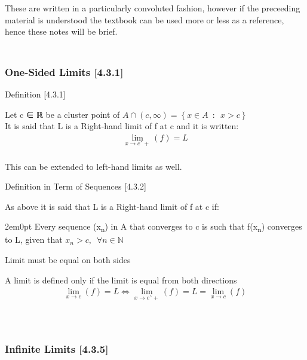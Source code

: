 These are written in a particularly convoluted fashion, however if the
preceeding material is understood the textbook can be used more or less
as a reference, hence these notes will be brief.

\hypertarget{one-sided-limits-4.3.1}{%
\subsubsection[\hfill\break
One-Sided Limits
{[}4.3.1{]}]{\texorpdfstring{\protect\hypertarget{SECTION00013100000000000000}{}{}\protect\hypertarget{one-sided-limits-4.3.1}{}{}~\\
One-Sided Limits
{[}4.3.1{]}}{ One-Sided Limits {[}4.3.1{]}}}\label{one-sided-limits-4.3.1}}

Definition {[}4.3.1{]}\protect\hypertarget{definition-4.3.1}{}{}

Let {c} ∈ ℝ be a cluster point of
\(A\cap \left( c, \infty \right) = \left\{ x \in A \enspace : \enspace x > c \right\}\)\\
It is said that {L} is a {Right-hand limit of {f} at {c}} and it is
written:\\
\[\begin{aligned} \lim_{x
\rightarrow cˆ+} \left( f
\right) = L \tag{4.3.1}
\label{431}\end{aligned}\]\\

This can be extended to left-hand limits as well.

Definition in Term of Sequences {[}4.3.2{]}

As above it is said that {L} is a {Right-hand limit of {f} at {c}} if:

2em0pt Every sequence ({x}\textsubscript{{n}}) in {A} that converges to
{c} is such that {f}({x}\textsubscript{{n}}) converges to {L}, given
that \(x_n>c, \enspace \forall n \in \mathbb{N}\)

Limit must be equal on both
sides\protect\hypertarget{limit-must-be-equal-on-both-sides}{}{}

A limit is defined only if the limit is equal from both directions\\
\[\begin{aligned}
\lim_{x\rightarrow
c}\left( f \right) = L
\iff \lim_{x\rightarrow
cˆ+}\left( f \right) = L =
\lim_{x\rightarrow c
}\left( f \right)
\tag{3.4.3}
\label{343}\end{aligned}\]\\

\hypertarget{infinite-limits-4.3.5}{%
\subsubsection[\hfill\break
Infinite Limits
{[}4.3.5{]}]{\texorpdfstring{\protect\hypertarget{SECTION00013200000000000000}{}{}\protect\hypertarget{infinite-limits-4.3.5}{}{}~\\
Infinite Limits
{[}4.3.5{]}}{ Infinite Limits {[}4.3.5{]}}}\label{infinite-limits-4.3.5}}

